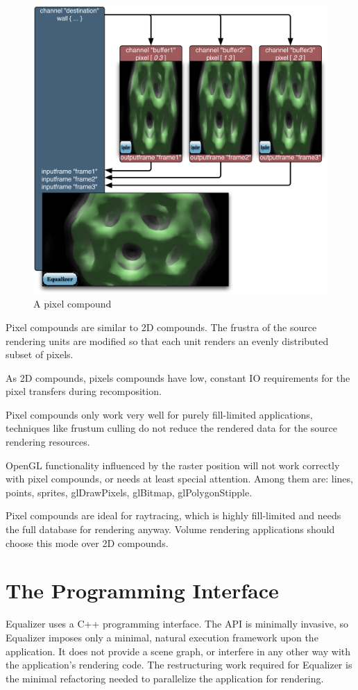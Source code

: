 \documentclass[10pt,a4]{scrartcl}
\begin{document}
\begin{figure}
  \includegraphics[width=.618\textwidth]{images/Pixel.pdf}
  {\caption{\small A pixel compound}}
\end{figure}
Pixel compounds are similar to 2D compounds. The frustra of the
source rendering units are modified so that each unit renders an evenly
distributed subset of pixels. 

As 2D compounds, pixels compounds have low, constant IO requirements for
the pixel transfers during recomposition.

Pixel compounds only work very well for purely fill-limited
applications, techniques like frustum culling do not reduce the rendered
data for the source rendering resources.

OpenGL functionality influenced by the raster position will not work
correctly with pixel compounds, or needs at least special
attention. Among them are: lines, points, sprites, glDrawPixels,
glBitmap, glPolygonStipple.

Pixel compounds are ideal for raytracing, which is highly fill-limited
and needs the full database for rendering anyway. Volume rendering
applications should choose this mode over 2D compounds.



\section{The Programming Interface}

Equalizer uses a C++ programming interface. The API is minimally
invasive, so Equalizer imposes only a minimal, natural execution
framework upon the application. It does not provide a scene graph, or
interfere in any other way with the application's rendering code. The
restructuring work required for Equalizer is the minimal refactoring
needed to parallelize the application for rendering.
\end{document}
